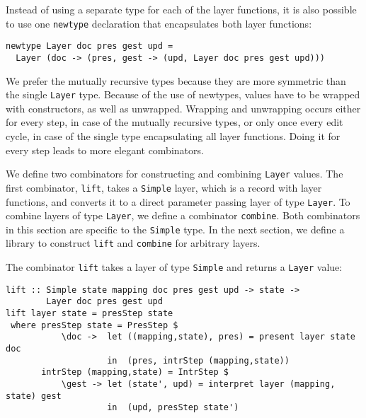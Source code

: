Instead of using a separate type for each of the layer functions, it is also possible to use one \texttt{newtype} declaration that encapsulates both layer functions:

\begin{small}
\begin{verbatim}
newtype Layer doc pres gest upd = 
  Layer (doc -> (pres, gest -> (upd, Layer doc pres gest upd)))
\end{verbatim}
\end{small}

We prefer the mutually recursive types because they are more symmetric than the single \texttt{Layer} type. Because of the use of newtypes, values have to be wrapped with constructors, as well as unwrapped. Wrapping and unwrapping occurs either for every step, in case of the mutually recursive types, or only once every edit cycle, in case of the single type encapsulating all layer functions. Doing it for every step leads to more elegant combinators.

We define two combinators for constructing and combining \texttt{Layer} values. The first combinator, \texttt{lift}, takes a \texttt{Simple} layer, which is a record with layer functions, and converts it to a direct parameter passing layer of type \texttt{Layer}. To combine layers of type \texttt{Layer}, we define a combinator \texttt{combine}. Both combinators in this section are specific to the \texttt{Simple} type. In the next section, we define a library to construct \texttt{lift} and \texttt{combine} for arbitrary layers.


The combinator \texttt{lift} takes a layer of type \texttt{Simple} and returns a \texttt{Layer} value:

\begin{small}
\begin{verbatim}
lift :: Simple state mapping doc pres gest upd -> state -> 
        Layer doc pres gest upd
lift layer state = presStep state 
 where presStep state = PresStep $
           \doc ->  let ((mapping,state), pres) = present layer state doc                                         
                    in  (pres, intrStep (mapping,state))
       intrStep (mapping,state) = IntrStep $
           \gest -> let (state', upd) = interpret layer (mapping, state) gest                     
                    in  (upd, presStep state')
\end{verbatim}
\end{small}

